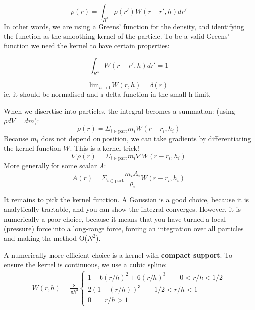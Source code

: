 \documentclass[12pt]{article}
\begin{document}
\begin{equation}
 \rho(r) = \int_{R^3} \rho(r') W(r-r', h) dr'
\end{equation}
In other words, we are using a Greens' function for the density, and identifying the function as the smoothing kernel of the particle. To be a valid Greens' function we need the kernel to have certain properties:

\begin{equation}
 \int_{R^3} W(r-r', h) dr' = 1
\end{equation}

\begin{equation}
 \mathrm{lim}_{h\to 0}  W(r, h) = \delta(r)
\end{equation}
ie, it should be normalised and a delta function in the small h limit.

When we discretise into particles, the integral becomes a summation: (using $\rho dV = dm$):
\begin{equation}
 \rho(r) = \Sigma_{i \in \mathrm{part}} m_i W(r-r_i, h_i)
\end{equation}
Because $m_i$ does not depend on position, we can take gradients by differentiating the kernel function $W$. This is a kernel trick!
\begin{equation}
 \nabla \rho(r) = \Sigma_{i \in \mathrm{part}} m_i \nabla W(r-r_i, h_i)
\end{equation}
More generally for some scalar $A$:
\begin{equation}
 A(r) = \Sigma_{i \in \mathrm{part}} \frac{m_i A_i}{\rho_i} W(r-r_i, h_i)
\end{equation}

It remains to pick the kernel function. A Gaussian is a good choice, because it is analytically tractable, and you can show the integral converges. However, it is numerically a poor choice, because it means that you have turned a local (pressure) force into a long-range force, forcing an integration over all particles and making the method O($N^2$).

A numerically more efficient choice is a kernel with \textbf{compact support}. To ensure the kernel is continuous, we use a cubic spline:
\begin{align}
 W(r,h) = \frac{8}{\pi h^3}
 \begin{cases}
 1 - 6(r/h)^2 + 6 (r/h)^3 \qquad 0 < r/h < 1/2\\
 2(1- (r/h))^3 \qquad 1/2 < r/h < 1\\
 0 \qquad r/h > 1
 \end{cases}
\end{align}
\end{document}
